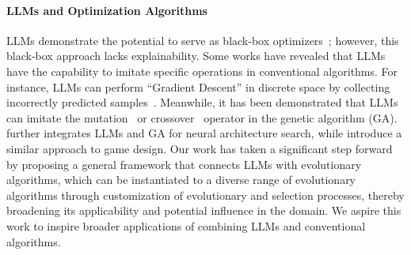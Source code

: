 \paragraph{LLMs and Optimization Algorithms}
LLMs demonstrate the potential to serve as black-box optimizers~\citep{zheng2023can}; however, this black-box approach lacks explainability. Some works have revealed that LLMs have the capability to imitate specific operations in conventional algorithms. For instance, LLMs can perform ``Gradient Descent'' in discrete space by collecting incorrectly predicted samples~\citep{pryzant2023automatic, guo2023learning}. Meanwhile, it has been demonstrated that LLMs can imitate the mutation~\citep{Lehman2023evolution} or crossover~\citep{meyerson2023language} operator in the genetic algorithm (GA). \cite{chen2023evoprompting} further integrates LLMs and GA for neural architecture search, while \cite{lanzi2023chatgpt} introduce a similar approach to game design. Our work has taken a significant step forward by proposing a general framework that connects LLMs with evolutionary algorithms, which can be instantiated to a diverse range of evolutionary algorithms through customization of evolutionary and selection processes, thereby broadening its applicability and potential influence in the domain. We aspire this work to inspire broader applications of combining LLMs and conventional algorithms.



